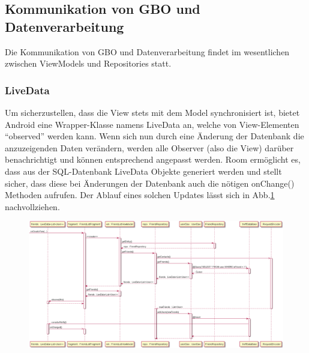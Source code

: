 \documentclass[parskip=full,11pt]{scrartcl}
\begin{document}
\subsection{Kommunikation von GBO und Datenverarbeitung}
Die Kommunikation von GBO und Datenverarbeitung findet im wesentlichen zwischen
ViewModels und Repositories statt.

\subsubsection{LiveData} \label{sec:livedata}
Um sicherzustellen, dass die View stets mit dem Model synchronisiert ist,
bietet Android eine Wrapper-Klasse namens LiveData an, welche von View-Elementen
\enquote{observed} werden kann. Wenn sich nun durch eine Änderung der Datenbank
die anzuzeigenden Daten verändern, werden alle Observer (also die View) darüber
benachrichtigt und können entsprechend angepasst werden.
Room ermöglicht es, dass aus der SQL-Datenbank LiveData Objekte generiert
werden und stellt sicher, dass diese bei Änderungen der Datenbank auch die
nötigen onChange() Methoden aufrufen. Der Ablauf eines solchen Updates lässt
sich in Abb.\ref{fig:datafetch} nachvollziehen.

\begin{figure}
	\centering
	\includegraphics[width = \paperheight / 30 * 19, angle = 90]{datafetch.png}
	\label{fig:datafetch}
\end{figure}
\end{document}
